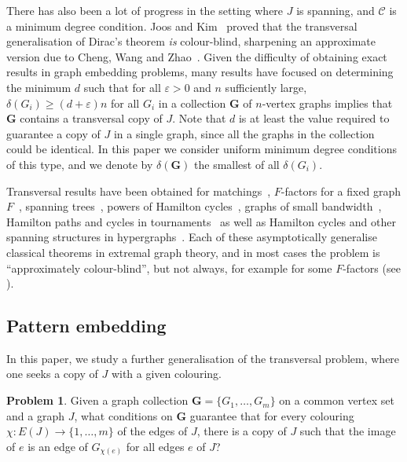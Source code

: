 \documentclass[11pt, dvipsnames]{amsart}
\theoremstyle{plain}
\theoremstyle{definition}
\newtheorem{problem}[theo]{Problem}
\newcommand{\mc}[1]{\mathcal{#1}}
\newcommand{\mbf}[1]{\mathbf{#1}}
\newcommand{\eps}{\varepsilon}
\newcommand{\dD}{\delta}
\begin{document}
There has also been a lot of progress in the setting where $J$ is spanning, and $\mc{C}$ is a minimum degree condition. Joos and Kim~\cite{jooskim} proved that the transversal generalisation of Dirac's theorem \emph{is} colour-blind, sharpening an approximate version due to Cheng, Wang and Zhao~\cite{Cheng1}. 
Given the difficulty of obtaining exact results in graph embedding problems, many results have focused on determining %
the minimum $d$ such that for all $\eps>0$ and $n$ sufficiently large, $\dD(G_i) \geq (d+\eps)n$ for all $G_i$ in a collection $\mathbf{G}$ of $n$-vertex graphs implies that $\mathbf{G}$ contains a transversal copy of $J$.
Note that $d$ is at least the value required to guarantee a copy of $J$ in a single graph, since all the graphs in the collection could be identical.
In this paper we consider uniform minimum degree conditions of this type, and we denote by $\delta(\mbf G)$ the smallest of all $\delta(G_i)$.

Transversal results have been obtained for matchings~\cite{jooskim}, $F$-factors for a fixed graph $F$~\cite{mmp}, spanning trees~\cite{mmp}, powers of Hamilton cycles~\cite{ghmps}, graphs of small bandwidth~\cite{CIKL}, Hamilton paths and cycles in tournaments~\cite{chakraborti2023hamilton} as well as
Hamilton cycles and other spanning structures in hypergraphs~\cite{Cheng2,ghmps}.
Each of these asymptotically generalise classical theorems in extremal graph theory, and in most cases the problem is ``approximately colour-blind'', but not always, for example for some $F$-factors (see \cite[Proposition 6.4]{mmp}). 

\subsection{Pattern embedding}

In this paper, we study a further generalisation of the transversal problem, where one seeks a copy of $J$ with a given colouring. %

\begin{problem}\label{prob:1}
    Given a graph collection $\mathbf{G}=\{G_1,\ldots,G_m\}$ on a common vertex set and a graph $J$, what conditions on $\mathbf{G}$ guarantee that for every colouring $\chi: E(J) \to \{1,\ldots,m\}$ of the edges of $J$, there is a copy of $J$ such that the image of $e$ is an edge of $G_{\chi(e)}$ for all edges $e$ of $J$?
\end{problem}
\end{document}
